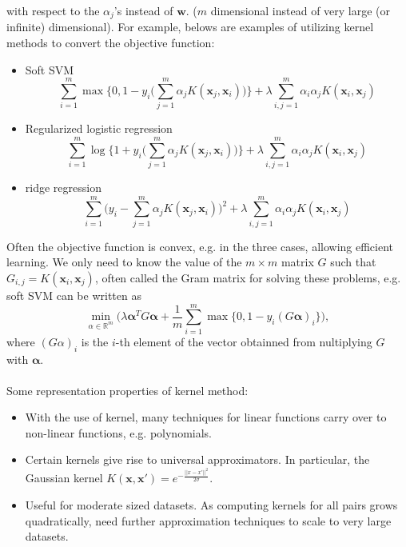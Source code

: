 \documentclass{article}
\begin{document}
    with respect to the $\alpha_j$'s instead of $\mathbf{w}$. ($m$ dimensional instead of very large (or infinite) dimensional).
    For example, belows are examples of utilizing kernel methods to convert the objective function:
    \begin{itemize}
    \item Soft SVM
    \begin{equation}
    \sum_{i=1}^m \max \Bigg\{ 0, 1-y_i \Bigg( \sum_{j=1}^m \alpha_j K(\mathbf{x}_j, \mathbf{x}_i) \Bigg) \Bigg\} + \lambda \sum_{i,j=1}^m \alpha_i \alpha_j K(\mathbf{x}_i, \mathbf{x}_j)
    \end{equation}
    \item Regularized logistic regression
    \begin{equation}
    \sum_{i=1}^m \log \Bigg\{ 1+y_i \Bigg( \sum_{j=1}^m \alpha_j K(\mathbf{x}_j, \mathbf{x}_i) \Bigg) \Bigg\} + \lambda \sum_{i,j=1}^m \alpha_i \alpha_j K(\mathbf{x}_i, \mathbf{x}_j)
    \end{equation}
    \item ridge regression
    \begin{equation}
    \sum_{i=1}^m \Bigg(y_i - \sum_{j=1}^m \alpha_j K(\mathbf{x}_j, \mathbf{x}_i) \Bigg)^2 + \lambda \sum_{i,j=1}^m \alpha_i \alpha_j K(\mathbf{x}_i, \mathbf{x}_j)
    \end{equation}
    \end{itemize}
    Often the objective function is convex, e.g. in the three cases, allowing efficient learning. We only need to know the value of the $m \times m$ matrix $G$ such that $G_{i,j} = K(\mathbf{x}_i, \mathbf{x}_j)$, often called the Gram matrix for solving these problems, e.g. soft SVM can be written as
    \begin{equation}
    \min_{\alpha \in \mathbb{R}^m} \Bigg( \lambda \mathbf{\alpha}^T G \mathbf{\alpha} + \frac{1}{m} \sum_{i=1}^m \max \{ 0, 1-y_i(G \mathbf{\alpha})_i \} \Bigg),
    \end{equation}
   where $(G\alpha)_i$ is the $i$-th element of the vector obtainned from nultiplying $G$ with $\mathbf{\alpha}$.
   \\\\
   Some representation properties of kernel method:
   \begin{itemize}
   \item With the use of kernel, many techniques for linear functions carry over to non-linear functions, e.g. polynomials.
   \item Certain kernels give rise to universal approximators. In particular, the Gaussian kernel $K(\mathbf{x}, \mathbf{x}') = e^{-\frac{||x-x'||^2}{2\sigma}}$.
   \item Useful for moderate sized datasets. As computing kernels for all pairs grows quadratically, need further approximation techniques to scale to very large datasets.
   \end{itemize}
   
\end{document}
